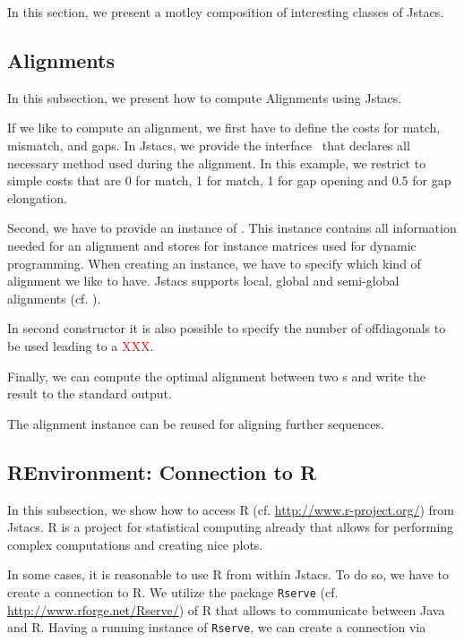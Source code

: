 \setcounter{off}{578}

In this section, we present a motley composition of interesting classes of Jstacs.

\subsection{Alignments}

In this subsection, we present how to compute Alignments using Jstacs.

If we like to compute an alignment, we first have to define the costs for match, mismatch, and gaps. In Jstacs, we provide the interface \Costs~that declares all necessary method used during the alignment. In this example, we restrict to simple costs that are 0 for match, 1 for match, 1 for gap opening and 0.5 for gap elongation.
 
\addtocounter{off}{3}

Second, we have to provide an instance of \Alignment. This instance contains all information needed for an alignment and stores for instance matrices used for dynamic programming. When creating an instance, we have to specify which kind of alignment we like to have. Jstacs supports local, global and semi-global alignments (cf. \AlignmentType).  

\addtocounter{off}{4}

In second constructor it is also possible to specify the number of offdiagonals to be used leading to a \textcolor {red}{XXX}. 

Finally, we can compute the optimal alignment between two \Sequence s and write the result to the standard output.


The alignment instance can be reused for aligning further sequences.

\subsection{REnvironment: Connection to R}

In this subsection, we show how to access R (cf. \url{http://www.r-project.org/}) from Jstacs. R is a project for statistical computing already that allows for performing complex computations and creating nice plots.

In some cases, it is reasonable to use R from within Jstacs. To do so, we have to create a connection to R. We utilize the package \lstinline+Rserve+ (cf. \url{http://www.rforge.net/Rserve/}) of R that allows to communicate between Java and R. Having a running instance of \lstinline+Rserve+, we can create a connection via  

